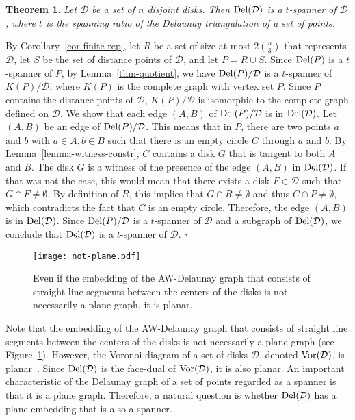 \documentclass[pdftex,leqno,fleqn,12pt]{article}
\newcommand{\DEL}{{\rm{Del}}}
\newcommand{\VOR}{{\rm{Vor}}}
\newtheorem{theorem}{Theorem}[section]
\newenvironment{proof}{{\textit Proof:} \rm}{\hfill $\square$ \medskip\\}
\begin{document}
\begin{theorem}\label{thm-del-disks} Let $\mathcal{D}$ be a set of $n$ disjoint disks.
Then $\DEL(\mathcal{D})$ is a $t$-spanner of $\mathcal{D}$, where $t$ is the spanning ratio of the
Delaunay triangulation of a set of points.
\end{theorem}
\begin{proof}
By Corollary~\ref{cor-finite-rep}, let $R$ be a set of size at most $2\binom{n}{3}$ that represents
$\mathcal{D}$, let $S$ be the set of distance points of $\mathcal{D}$, and let $P=R\cup S$. Since
$\DEL(P)$ is a $t$-spanner of $P$, by Lemma~\ref{thm-quotient}, we have $\DEL(P)/\mathcal{D}$ is a
$t$-spanner of $K(P)/\mathcal{D}$, where $K(P)$ is the complete graph with vertex set $P$.
Since $P$ contains the distance points of $\mathcal{D}$,
$K(P)/\mathcal{D}$ is isomorphic to the complete graph defined on $\mathcal{D}$. We show that each
edge $(A,B)$ of $\DEL(P)/\mathcal{D}$ is in $\DEL(\mathcal{D})$. Let $(A,B)$ be an edge of
$\DEL(P)/\mathcal{D}$. This means that in $P$, there are two points $a$ and $b$ with $a\in A,b\in
B$ such that there is an empty circle $C$ through $a$ and $b$. By Lemma~\ref{lemma-witness-constr},
$C$ contains a disk $G$ that is tangent to both $A$ and $B$. The disk $G$ is a witness of the
presence of the edge $(A,B)$ in $\DEL(\mathcal{D})$. If that was not the case, this would mean that
there exists a disk $F\in\mathcal{D}$ such that $G\cap F\neq\emptyset$. By definition of $R$, this
implies that $G\cap R\neq\emptyset$ and thus $C\cap P\neq\emptyset$, which contradicts the fact
that $C$ is an empty circle. Therefore, the edge $(A,B)$ is in $\DEL(\mathcal{D})$.
Since $\DEL(P)/\mathcal{D}$ is a $t$-spanner of $\mathcal{D}$ and a subgraph of
$\DEL(\mathcal{D})$, we conclude that $\DEL(\mathcal{D})$ is a $t$-spanner of $\mathcal{D}$.
\end{proof}



\begin{figure}
\centering\texttt{[image: not-plane.pdf]}\caption{Even if the embedding of the AW-Delaunay graph
that consists of straight line segments between the centers of the disks is not necessarily a plane
graph, it is planar.}\label{fig-not-plane}
\end{figure}


Note that the embedding of the AW-Delaunay graph that consists of straight line segments between
the centers of the disks is not necessarily a plane graph (see Figure~\ref{fig-not-plane}).
However, the Voronoi diagram of a set of disks $\mathcal{D}$, denoted $\VOR(\mathcal{D})$, is
planar~\cite{okabe00}. Since $\DEL(\mathcal{D})$ is the face-dual of $\VOR(\mathcal{D})$, it is
also planar. An important characteristic of the Delaunay graph of a set of points regarded as a
spanner is that it is a plane graph. Therefore, a natural question is whether $\DEL(\mathcal{D})$
has a plane embedding that is also a spanner.
\end{document}

